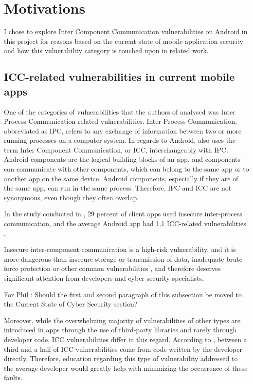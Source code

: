 	\section{Motivations}
	    \label{sec:intro_motivations}
	    
	    I chose to explore Inter Component Communication vulnerabilities on Android in this project for reasons based on the current state of mobile application security and how this vulnerability category is touched upon in related work.
	    
	    \subsection{ICC-related vulnerabilities in current mobile apps}
	        \label{subsec:ICC_vulnerabilities_current_apps}
	    
    	One of the categories of vulnerabilities that the authors of \cite{pt_mobile_apps_2019} analysed was Inter Process Communication related vulnerabilities. Inter Process Communication, abbreviated as IPC, refers to any exchange of information between two or more running processes on a computer system. In regards to Android, \cite{pt_mobile_apps_2019} also uses the term Inter Component Communication, or ICC, interchangeably with IPC. Android components are the logical building blocks of an app, and components can communicate with other components, which can belong to the same app or to another app on the same device. Android components, especially if they are of the same app, can run in the same process. Therefore, IPC and ICC are not synonymous, even though they often overlap.
    	
    	In the study conducted in \cite{pt_mobile_apps_2019}, 29 percent of client apps used insecure inter-process communication, and the average Android app had 1.1 ICC-related vulnerabilities \cite{pt_mobile_apps_2019}.
    	
    	Insecure inter-component communication is a high-risk vulnerability, and it is more dangerous than insecure storage or transmission of data, inadequate brute force protection or other common vulnerabilities \cite{pt_mobile_apps_2019}, and therefore deserves significant attention from developers and cyber security specialists.
		
		For Phil : Should the first and second paragraph of this subsection be moved to the Current State of Cyber Security section? 
		
		Moreover, while the overwhelming majority of vulnerabilities of other types are introduced in apps through the use of third-party libraries and rarely through developer code, ICC vulnerabilities differ in this regard. According to \cite{android_vulnerabilities_evolution}, between a third and a half of ICC vulnerabilities come from code written by the developer directly. Therefore, education regarding this type of vulnerability addressed to the average developer would greatly help with minimizing the occurrence of these faults.
		
